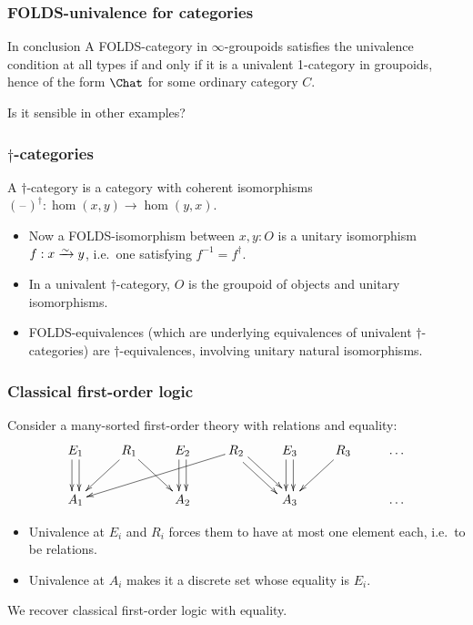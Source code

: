 \documentclass{beamer}
\newcommand{\blank}{\mathord{\hspace{1pt}\text{--}\hspace{1pt}}}
\begin{document}
\begin{frame}
  \frametitle{FOLDS-univalence for categories}
  \begin{block}{In conclusion}
    A FOLDS-category in $\infty$-groupoids satisfies the univalence condition at all types if and only if it is a univalent 1-category in groupoids, hence of the form $\Chat$ for some ordinary category $C$.
  \end{block}
  \pause
  Is it sensible in other examples?
\end{frame}

\begin{frame}[t]
  \frametitle{$\dagger$-categories}
  \begin{definition}
    A \alert<1>{$\dagger$-category} is a category with coherent isomorphisms $(\blank)^\dagger : \hom(x,y) \to \hom(y,x)$.
  \end{definition}
  \pause
  \begin{itemize}
  \item Now a FOLDS-isomorphism between $x,y:O$ is a \alert<2>{unitary isomorphism} $f:x\toiso y$, i.e.\ one satisfying $f^{-1} = f^\dagger$.
    \pause
  \item In a univalent $\dagger$-category, $O$ is the groupoid of objects and unitary isomorphisms.
  \item FOLDS-equivalences (which are underlying equivalences of univalent $\dagger$-categories) are \alert{$\dagger$-equivalences}, involving unitary natural isomorphisms.
  \end{itemize}
\end{frame}

\begin{frame}
  \frametitle{Classical first-order logic}
  Consider a many-sorted first-order theory with relations and equality:
  \[ \xymatrix{
    E_1 \ar@<1mm>[d] \ar@<-1mm>[d] & R_1 \ar[dl] \ar[dr] & E_2 \ar@<1mm>[d] \ar@<-1mm>[d] & R_2 \ar[dlll] \ar@<1mm>[dr] \ar@<-1mm>[dr] & E_3 \ar@<1mm>[d] \ar@<-1mm>[d] & R_3 \ar[dl] & \dots \\
    A_1 && A_2 && A_3 && \dots
  }\]
  \begin{itemize}
  \item Univalence at $E_i$ and $R_i$ forces them to have at most one element each, i.e.\ to be relations.
  \item Univalence at $A_i$ makes it a discrete set whose equality is $E_i$.
  \end{itemize}
  We recover classical first-order logic with equality.
\end{frame}
\end{document}
